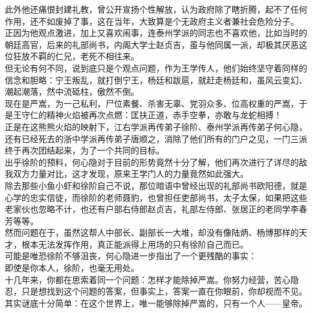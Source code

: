 \begin{multicols}{\theparacolNo}
此外他还痛恨封建礼教，曾公开宣扬个性解放，认为政府除了瞎折腾，起不了任何作用，还不如废掉了事，这在当年，大致算是个无政府主义者兼社会危险分子。\\

正因为他观点激进，加上又喜欢闹事，连泰州学派的同志也不喜欢他，比如当时的朝廷高官，后来的礼部尚书，内阁大学士赵贞吉，虽与他同属一派，却极其厌恶这位狂放不羁的仁兄，老死不相往来。\\

但无论有何不同，说到底只是个观点问题，作为王学传人，他们始终坚守着同样的信念和胆略：宁王叛乱，就打倒宁王，杨廷和跋扈，就赶走杨廷和，虽风云变幻、潮起潮落，然中流砥柱，傲然不倒。\\

现在是严嵩，为一己私利，尸位素餐、杀害无辜、党羽众多、位高权重的严嵩，于是王守仁的精神火焰被再次点燃：匡扶正道，赤手空拳，亦敢与龙蛇相搏！\\

正是在这熊熊火焰的映射下，江右学派再传弟子徐阶、泰州学派再传弟子何心隐，还有已经死去的浙中学派再传弟子唐顺之，消除了他们所有的门户之见，一门三派终于再次团结起来，为了一个共同的目标。\\

出乎徐阶的预料，何心隐对于目前的形势竟然十分了解，他们再次进行了详尽的敌我双方力量对比，这才发现，原来王学门人的力量竟然如此强大。\\

除去那些小鱼小虾和徐阶自己不说，那位暗语中曾经出现的礼部尚书欧阳德，就是心学的忠实信徒，而徐阶的老师聂豹，也曾担任吏部尚书，太子太保，如果把这些老家伙也忽略不计，也还有户部右侍郎赵贞吉，礼部左侍郎、张居正的老同学李春芳等等。\\

然而问题在于，虽然这帮人中部长、副部长一大堆，却没有像陆炳、杨博那样的天才，根本无法发挥作用，真正能派得上用场的只有徐阶自己而已。\\

可能是唯恐徐阶不够沮丧，何心隐进一步指出了一个更残酷的事实：\\

即使是你本人，徐阶，也毫无用处。\\

十几年来，你都在思索着同一个问题：怎样才能除掉严嵩。你努力经营，苦心隐忍，只是想找到这个问题的答案，但事实上，答案一直在你眼前，你却视而不见。\\

其实谜底十分简单：在这个世界上，唯一能够除掉严嵩的，只有一个人——皇帝。\\


\end{multicols}
